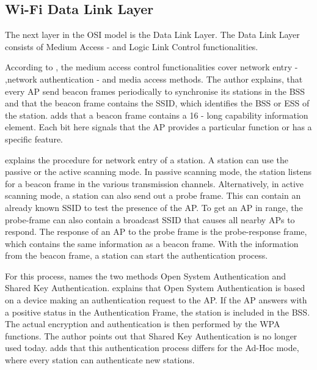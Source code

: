 \subsection*{Wi-Fi Data Link Layer}

The next layer in the OSI model is the Data Link Layer.
The Data Link Layer consists of Medium Access - and Logic Link Control functionalities.


According to \textcite{kauffels_wireless_2002}, the medium access control functionalities cover network entry - ,network authentication - and media access methods.
The author explains, that every \ac{AP} send beacon frames periodically to synchronise its stations in the \ac{BSS} and that the beacon frame contains the \ac{SSID}, which identifies the \ac{BSS} or \ac{ESS} of the station. \textcite{sauter_wireless_2022} adds that a beacon frame contains a \SI{16}{\bit} - long capability information element. Each bit here signals that the \ac{AP} provides a particular function or has a specific feature.

\textcite{kauffels_wireless_2002} explains the procedure for network entry of a station.
A station can use the passive or the active scanning mode.
In passive scanning mode, the station listens for a beacon frame in the various transmission channels.
Alternatively, in active scanning mode, a station can also send out a probe frame.
This can contain an already known \ac{SSID} to test the presence of the \ac{AP}.
To get an \ac{AP} in range, the probe-frame can also contain a broadcast SSID that causes all nearby \ac{AP}s to respond.
The response of an \ac{AP} to the probe frame is the probe-response frame, which contains the same information as a beacon frame.
With the information from the beacon frame, a station can start the authentication process.

For this process, \textcite{kauffels_wireless_2002} names the two methods Open System Authentication and Shared Key Authentication.
\textcite{sauter_wireless_2022} explains that Open System Authentication is based on a device making an authentication
request to the \ac{AP}. If the \ac{AP} answers with a positive status in the Authentication Frame,
the station is included in the \ac{BSS}.
The actual encryption and authentication is then performed by the \ac{WPA} functions.
The author points out that Shared Key Authentication is no longer used today.
\textcite{sommer_vehicular_2014} adds that this authentication process differs for the Ad-Hoc mode, where every station can
authenticate new stations.

